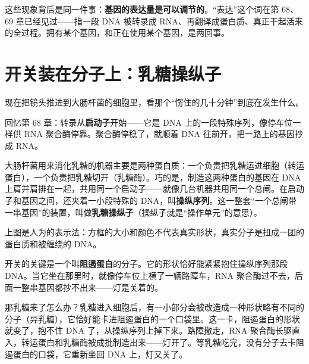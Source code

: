 这些现象背后是同一件事：\textbf{基因的表达量是可以调节的}。“表达”这个词在第 68、69 章已经见过——指一段 DNA 被转录成 RNA、再翻译成蛋白质、真正干起活来的全过程。拥有某个基因，和正在使用某个基因，是两回事。

\section{开关装在分子上：乳糖操纵子}

现在把镜头推进到大肠杆菌的细胞里，看那个“愣住的几十分钟”到底在发生什么。

回忆第 68 章：转录从\textbf{启动子}开始——它是 DNA 上的一段特殊序列，像停车位一样供 RNA 聚合酶停靠。聚合酶停稳了，就顺着 DNA 往前开，把一路上的基因抄成 RNA。

大肠杆菌用来消化乳糖的机器主要是两种蛋白质：一个负责把乳糖运进细胞（转运蛋白），一个负责把乳糖切开（乳糖酶）。巧的是，制造这两种蛋白的基因在 DNA 上肩并肩排在一起，共用同一个启动子——就像几台机器共用同一个总闸。在启动子和基因之间，还夹着一小段特殊的 DNA，叫\textbf{操纵序列}。这一整套“一个总闸带一串基因”的装置，叫做\textbf{乳糖操纵子}（操纵子就是“操作单元”的意思）。

\begin{center}
\end{center}

上图是人为的表示法：方框的大小和颜色不代表真实形状，真实分子是扭成一团的蛋白质和被缠绕的 DNA。

开关的关键是一个叫\textbf{阻遏蛋白}的分子。它的形状恰好能紧紧抱住操纵序列那段 DNA。当它坐在那里时，就像停车位上横了一辆路障车，RNA 聚合酶过不去，后面一整串基因都抄不出来——灯是关着的。

那乳糖来了怎么办？乳糖进入细胞后，有一小部分会被改造成一种形状略有不同的分子（异乳糖），它恰好能卡进阻遏蛋白的一个口袋里。这一卡，阻遏蛋白的形状就变了，抱不住 DNA 了，从操纵序列上掉下来。路障撤走，RNA 聚合酶长驱直入，转运蛋白和乳糖酶被成批制造出来——灯开了。等乳糖吃完，没有分子去卡阻遏蛋白的口袋，它重新坐回 DNA 上，灯又关了。

